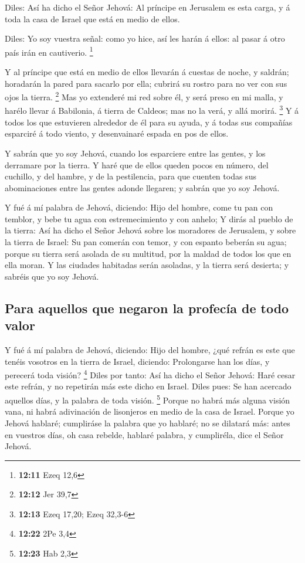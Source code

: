  Diles: Así ha dicho el Señor Jehová: Al príncipe en
Jerusalem es esta carga, y á toda la casa de Israel que está en medio de
ellos.

 Diles: Yo soy vuestra señal: como yo hice, así les harán
á ellos: al pasar á otro país irán en cautiverio. \footnote{\textbf{12:11}
  Ezeq 12,6}

 Y al príncipe que está en medio de ellos llevarán á
cuestas de noche, y saldrán; horadarán la pared para sacarlo por ella;
cubrirá su rostro para no ver con sus ojos la tierra. \footnote{\textbf{12:12}
  Jer 39,7}  Mas yo extenderé mi red sobre él, y será
preso en mi malla, y harélo llevar á Babilonia, á tierra de Caldeos; mas
no la verá, y allá morirá. \footnote{\textbf{12:13} Ezeq 17,20; Ezeq
  32,3-6}  Y á todos los que estuvieren alrededor de él
para su ayuda, y á todas sus compañías esparciré á todo viento, y
desenvainaré espada en pos de ellos.

 Y sabrán que yo soy Jehová, cuando los esparciere entre
las gentes, y los derramare por la tierra.  Y haré que de
ellos queden pocos en número, del cuchillo, y del hambre, y de la
pestilencia, para que cuenten todas sus abominaciones entre las gentes
adonde llegaren; y sabrán que yo soy Jehová.

 Y fué á mí palabra de Jehová, diciendo: 
Hijo del hombre, come tu pan con temblor, y bebe tu agua con
estremecimiento y con anhelo;  Y dirás al pueblo de la
tierra: Así ha dicho el Señor Jehová sobre los moradores de Jerusalem, y
sobre la tierra de Israel: Su pan comerán con temor, y con espanto
beberán su agua; porque su tierra será asolada de su multitud, por la
maldad de todos los que en ella moran.  Y las ciudades
habitadas serán asoladas, y la tierra será desierta; y sabréis que yo
soy Jehová.

\hypertarget{para-aquellos-que-negaron-la-profecuxeda-de-todo-valor}{%
\subsection{Para aquellos que negaron la profecía de todo
valor}\label{para-aquellos-que-negaron-la-profecuxeda-de-todo-valor}}

 Y fué á mí palabra de Jehová, diciendo: 
Hijo del hombre, ¿qué refrán es este que tenéis vosotros en la tierra de
Israel, diciendo: Prolongarse han los días, y perecerá toda visión?
\footnote{\textbf{12:22} 2Pe 3,4}  Diles por tanto: Así
ha dicho el Señor Jehová: Haré cesar este refrán, y no repetirán más
este dicho en Israel. Diles pues: Se han acercado aquellos días, y la
palabra de toda visión. \footnote{\textbf{12:23} Hab 2,3}
 Porque no habrá más alguna visión vana, ni habrá
adivinación de lisonjeros en medio de la casa de Israel. 
Porque yo Jehová hablaré; cumpliráse la palabra que yo hablaré; no se
dilatará más: antes en vuestros días, oh casa rebelde, hablaré palabra,
y cumpliréla, dice el Señor Jehová.

